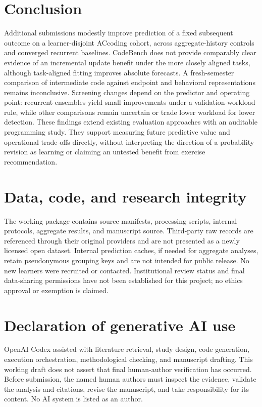 \documentclass[11pt]{article}
\newcommand{\1}{\mathbb{I}}
\begin{document}
\section{Conclusion}
Additional submissions modestly improve prediction of a fixed subsequent outcome on a learner-disjoint ACcoding cohort, across aggregate-history controls and converged recurrent baselines. CodeBench does not provide comparably clear evidence of an incremental update benefit under the more closely aligned tasks, although task-aligned fitting improves absolute forecasts. A fresh-semester comparison of intermediate code against endpoint and behavioral representations remains inconclusive. Screening changes depend on the predictor and operating point: recurrent ensembles yield small improvements under a validation-workload rule, while other comparisons remain uncertain or trade lower workload for lower detection. These findings extend existing evaluation approaches with an auditable programming study. They support measuring future predictive value and operational trade-offs directly, without interpreting the direction of a probability revision as learning or claiming an untested benefit from exercise recommendation.

\section*{Data, code, and research integrity}
The working package contains source manifests, processing scripts, internal protocols, aggregate results, and manuscript source. Third-party raw records are referenced through their original providers and are not presented as a newly licensed open dataset. Internal prediction caches, if needed for aggregate analyses, retain pseudonymous grouping keys and are not intended for public release. No new learners were recruited or contacted. Institutional review status and final data-sharing permissions have not been established for this project; no ethics approval or exemption is claimed.

\section*{Declaration of generative AI use}
OpenAI Codex assisted with literature retrieval, study design, code generation, execution orchestration, methodological checking, and manuscript drafting. This working draft does not assert that final human-author verification has occurred. Before submission, the named human authors must inspect the evidence, validate the analysis and citations, revise the manuscript, and take responsibility for its content. No AI system is listed as an author.
\end{document}
